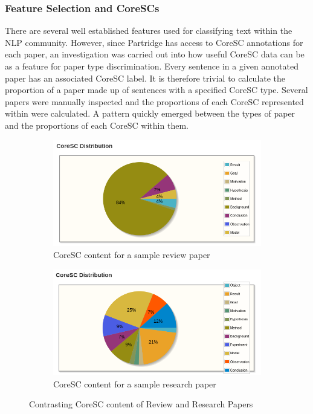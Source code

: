 \subsubsection{Feature Selection and CoreSCs}

There are several well established features used for classifying text within
the NLP community. However, since Partridge has access to CoreSC annotations
for each paper, an investigation was carried out into how useful CoreSC data
can be as a feature for paper type discrimination. Every sentence in a given
annotated paper has an associated CoreSC label. It is therefore trivial to
calculate the proportion of a paper made up of sentences with a specified
CoreSC type. Several papers were manually inspected and the proportions of each
CoreSC represented within were calculated. A pattern quickly emerged between
the types of paper and the proportions of each CoreSC within them. 

\begin{figure}[!h]
\centering
\begin{subfigure}[b]{0.6\textwidth}
\includegraphics[width=\textwidth]{images/implementation/review_corescs.png}
\caption{CoreSC content for a sample review paper}
\end{subfigure}
\begin{subfigure}[b]{0.6\textwidth}
\includegraphics[width=\textwidth]{images/implementation/report_corescs.png}
\caption{CoreSC content for a sample research paper}
\end{subfigure}

\caption{Contrasting CoreSC content of Review and Research Papers}
\label{fig:coresc_pies}
\end{figure}

